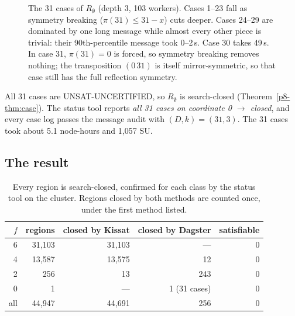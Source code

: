 \documentclass[11pt,a4paper,oneside]{report}
\theoremstyle{definition}
\newcommand{\st}[1]{\textsf{#1}}
\begin{document}
\begin{figure}[H]
\centering
{}
\caption{The 31 cases of $R_\emptyset$ (depth 3, 103 workers). Cases 1--23 fall as symmetry
breaking ($\pi(31)\le31-x$) cuts deeper. Cases 24--29 are dominated by one long message
while almost every other piece is trivial: their 90th-percentile message took 0--2\,s.
Case 30 takes 49\,s. In case 31, $\pi(31)=0$ is forced, so symmetry breaking removes
nothing; the transposition $(0\,31)$ is itself mirror-symmetric, so that case still has the full
reflection symmetry.}
\label{p8-fig:f0}
\end{figure}

All 31 cases are \st{UNSAT-UNCERTIFIED}, so $R_\emptyset$ is \st{search-closed}
(Theorem~\ref{p8-thm:case}). The status tool reports \emph{all 31 cases on coordinate 0
$\to$ closed}, and every case log passes the message audit with $(D,k)=(31,3)$. The 31
cases took about 5.1 node-hours and 1{,}057 SU.

\subsection{The result}\label{p8-sec:result}

\begin{table}[H]
\centering
\begin{tabular}{@{}rrrrr@{}}
\toprule
$f$ & regions & closed by Kissat & closed by Dagster & satisfiable \\
\midrule
6 & 31{,}103 & 31{,}103 & --- & 0 \\
4 & 13{,}587 & 13{,}575 & 12 & 0 \\
2 & 256 & 13 & 243 & 0 \\
0 & 1 & --- & 1 (31 cases) & 0 \\
\midrule
all & 44{,}947 & 44{,}691 & 256 & 0 \\
\bottomrule
\end{tabular}
\caption{Every region is \st{search-closed}, confirmed for each class by the status tool on
the cluster. Regions closed by both methods are counted once, under the first method listed.}
\label{p8-tab:final}
\end{table}
\end{document}
